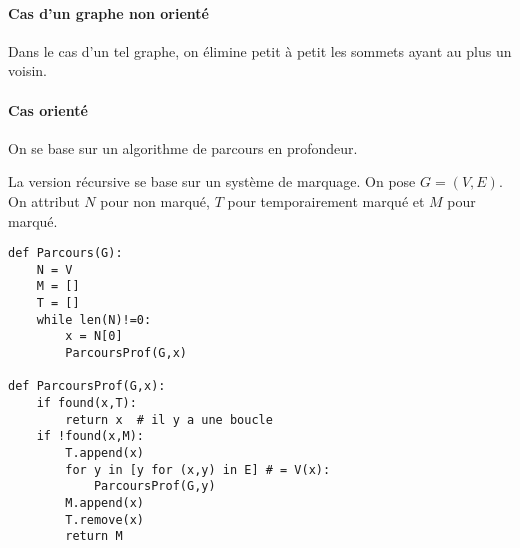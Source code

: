 \documentclass{mybourbaki}
\begin{document}
\paragraph{Cas d'un graphe non orienté}Dans le cas d'un tel graphe, on élimine petit à petit les sommets ayant au plus un voisin.

\paragraph{Cas orienté}On se base sur un algorithme de parcours en profondeur.

La version récursive se base sur un système de marquage. On pose $G = (V,E)$.
On attribut $N$ pour non marqué, $T$ pour temporairement marqué et $M$ pour marqué.
\begin{lstlisting}
def Parcours(G):
	N = V
	M = []
	T = []
	while len(N)!=0:
		x = N[0]
		ParcoursProf(G,x)
		
def ParcoursProf(G,x):
	if found(x,T):
		return x  # il y a une boucle
	if !found(x,M):	
		T.append(x)		
		for y in [y for (x,y) in E] # = V(x):
			ParcoursProf(G,y)
		M.append(x)
		T.remove(x)
		return M		
\end{lstlisting}
\end{document}
